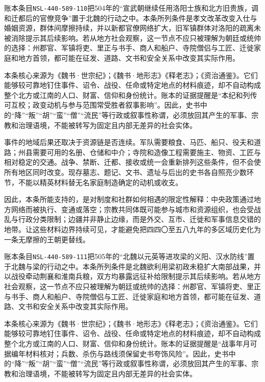 账本条目\texttt{NSL-440-589-110}把504年的“宣武朝继续任用洛阳士族和北方旧贵族，调和迁都后的官僚竞争”置于北魏的行动之中。本条所列条件是孝文改革改变入仕与婚姻资源，群体间摩擦持续，并以新都官僚网络扩大，旧军镇群体对洛阳的疏离未被消除提示其后续影响。若从地方社会观察，这一节点不应只被理解为朝廷或统帅的选择：州郡官、军镇将吏、里正与书手、商人和船户、寺院僧侣与工匠、迁徙家庭和地方首领，都可能在征发、道路、文书和安全关系中改变其实际作用。

本条核心来源为《魏书·世宗纪》；《魏书·地形志》《释老志》；《资治通鉴》。它们能够较可靠地钉住事件、诏令、战役、任命或特定地点的材料痕迹，却不自动构成整个北方或江南的人口、财富、信仰和身份统计。账本的证据提醒是“本纪和列传可互校；政变动机与参与范围常受胜者叙事影响”。因此，史书中的“降”“叛”“胡”“蛮”“僧”“流民”等行政或叙事性称谓，必须放回其产生的军事、宗教和治理语境，不能被转写为固定且内部无差异的社会实体。

事件的地域后果还取决于资源链是否连续。军队需要粮食、马匹、船只、役夫和道路；州县需要可用的名册、仓储和中介；寺院和造像工程需要施主、物资、工匠与相对稳定的交通。战争、禁断、迁都、接收或统一会重新排列这些条件，但不会使所有地区同时改变。现存墓志、题记、文书、遗址与后出的史书各自照亮少数环节，不能以精英材料替无名家庭制造确定的动机或收支。

因此，本条所能支持的，是对制度和社群如何相遇的限定性解释：中央政策通过地方网络而被执行、变通或落空；宗教共同体既可能参与城市和资源组织，也会受战乱与行政分类限制；边疆并非静止边缘，而是外交、互市、迁徙和军事信息交错的地带。让这些材料边界持续可见，才能避免把四四〇至五八九年的多区域历史化为一条无摩擦的王朝更替线。

账本条目\texttt{NSL-440-589-111}把505年的“北魏以元英等进攻梁的义阳、汉水防线”置于北魏与梁的行动之中。本条所列条件是北魏欲利用梁初政未稳扩大南部战果，并以战役牵动荆襄和淮南兵粮，双方均暴露远征补给限制提示其后续影响。若从地方社会观察，这一节点不应只被理解为朝廷或统帅的选择：州郡官、军镇将吏、里正与书手、商人和船户、寺院僧侣与工匠、迁徙家庭和地方首领，都可能在征发、道路、文书和安全关系中改变其实际作用。

本条核心来源为《魏书·世宗纪》；《魏书·地形志》《释老志》；《资治通鉴》。它们能够较可靠地钉住事件、诏令、战役、任命或特定地点的材料痕迹，却不自动构成整个北方或江南的人口、财富、信仰和身份统计。账本的证据提醒是“战事年月可据编年材料核对；兵数、杀伤与路线须保留史书夸饰风险”。因此，史书中的“降”“叛”“胡”“蛮”“僧”“流民”等行政或叙事性称谓，必须放回其产生的军事、宗教和治理语境，不能被转写为固定且内部无差异的社会实体。

